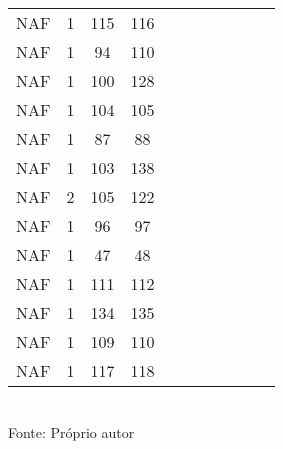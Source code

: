 \begin{table}[H]
{\begin{tabular}{ccccccccccc}
NAF & 1 & 115 & 116 &  &  &  &  &  &  &  \\
NAF & 1 & 94 & 110 &  &  &  &  &  &  &  \\
NAF & 1 & 100 & 128 &  &  &  &  &  &  &  \\
NAF & 1 & 104 & 105 &  &  &  &  &  &  &  \\
NAF & 1 & 87 & 88 &  &  &  &  &  &  &  \\
NAF & 1 & 103 & 138 &  &  &  &  &  &  &  \\
NAF & 2 & 105 & 122 &  &  &  &  &  &  &  \\
NAF & 1 & 96 & 97 &  &  &  &  &  &  &  \\
NAF & 1 & 47 & 48 &  &  &  &  &  &  &  \\
NAF & 1 & 111 & 112 &  &  &  &  &  &  &  \\
NAF & 1 & 134 & 135 &  &  &  &  &  &  &  \\
NAF & 1 & 109 & 110 &  &  &  &  &  &  &  \\
NAF & 1 & 117 & 118 &  &  &  &  &  &  &  \\
\bottomrule
\end{tabular}}
\\Fonte: Próprio autor
\end{table}


